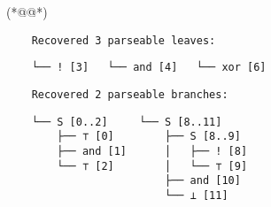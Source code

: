 \begin{minipage}[l]{6cm}
  \begin{halftidyinput}
  (*@\caret{ }@*)
  \end{halftidyinput}

  \begin{verbatim}
    Recovered 3 parseable leaves:
  \end{verbatim}
  \noindent\hspace{0.64cm}\hspace{1.70cm}\hspace{1.98cm}\vspace{-5pt}
  \begin{verbatim}
    └── ! [3]   └── and [4]   └── xor [6]
  \end{verbatim}

  \begin{verbatim}
    Recovered 2 parseable branches:
  \end{verbatim}
  \hspace{0.64cm}\hspace{2.51cm}\vspace{-5pt}
  \begin{verbatim}
    └── S [0..2]     └── S [8..11]
        ├── ⊤ [0]        ├── S [8..9]
        ├── and [1]      │   ├── ! [8]
        └── ⊤ [2]        │   └── ⊤ [9]
                         ├── and [10]
                         └── ⊥ [11]
  \end{verbatim}
\end{minipage}